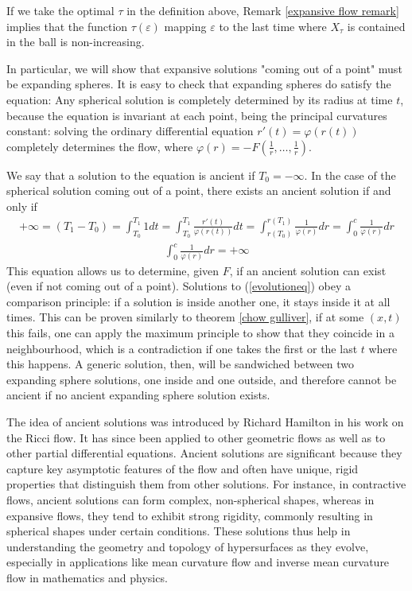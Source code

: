 \begin{oss}	
	If we take the optimal $\tau$ in the definition above, Remark \ref{expansive flow remark} implies that the function $\tau(\varepsilon)$ mapping $\varepsilon$ to the last time where $X_\tau$ is contained in the ball is non-increasing.
\end{oss} 


In particular, we will show that expansive solutions "coming out of a point" must be expanding spheres.
It is easy to check that expanding spheres do satisfy the equation: Any spherical solution is completely determined by its radius at time $t$, because the equation is invariant at each point, being the principal curvatures constant: solving the ordinary differential equation $r'(t) = \varphi(r(t))$ completely determines the flow, where $\varphi(r) = -F(\frac{1}{r}, \dots, \frac{1}{r})$.

We say that a solution to the equation is ancient if $T_0=-\infty$. 
In the case of the spherical solution coming out of a point, there exists an ancient solution if and only if
\begin{align*}
	+\infty=(T_1-T_0)=\int_{T_0}^{T_1} 1 dt = \int_{T_0}^{T_1}\frac{r'(t)}{\varphi(r(t))} dt = \int_{r(T_0)}^{r(T_1)}\frac{1}{\varphi(r)} dr = \int_{0}^{c}\frac{1}{\varphi(r)} dr
\end{align*}
\begin{align*}
	\int_{0}^{c}\frac{1}{\varphi(r)} dr =+\infty
\end{align*}
This equation allows us to determine, given $F$, if an ancient solution can exist (even if not coming out of a point). Solutions to (\ref{evolutioneq}) obey a comparison principle: if a solution is inside another one, it stays inside it at all times. This can be proven similarly to theorem \ref{chow gulliver}, if at some $(x, t)$ this fails, one can apply the maximum principle to show that they coincide in a neighbourhood, which is a contradiction if one takes the first or the last $t$ where this happens. A generic solution, then, will be sandwiched between two expanding sphere solutions, one inside and one outside, and therefore cannot be ancient if no ancient expanding sphere solution exists. 


The idea of ancient solutions was introduced by Richard Hamilton in his work on the Ricci flow. It has since been applied to other geometric flows as well as to other partial differential equations. Ancient solutions are significant because they capture key asymptotic features of the flow and often have unique, rigid properties that distinguish them from other solutions. For instance, in contractive flows, ancient solutions can form complex, non-spherical shapes, whereas in expansive flows, they tend to exhibit strong rigidity, commonly resulting in spherical shapes under certain conditions. These solutions thus help in understanding the geometry and topology of hypersurfaces as they evolve, especially in applications like mean curvature flow and inverse mean curvature flow in mathematics and physics.


